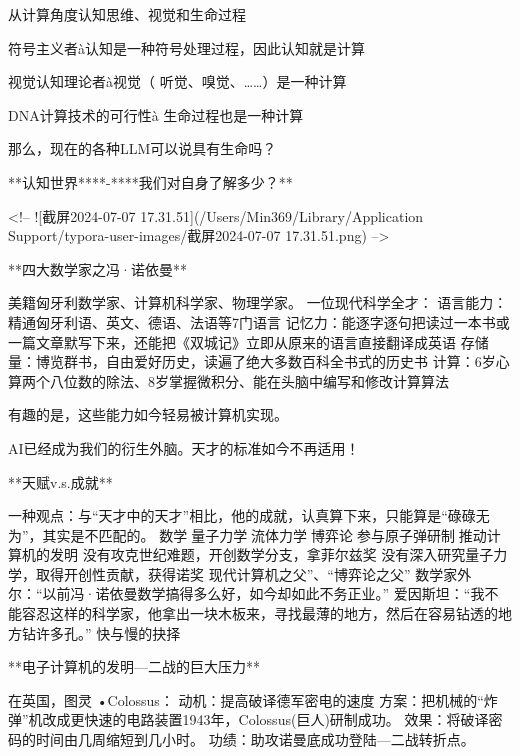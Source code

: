 从计算角度认知思维、视觉和生命过程



符号主义者à认知是一种符号处理过程，因此认知就是计算

视觉认知理论者à视觉（ 听觉、嗅觉、……）是一种计算

DNA计算技术的可行性à 生命过程也是一种计算

那么，现在的各种LLM可以说具有生命吗？



**认知世界****-****我们对自身了解多少？**

<!-- ![截屏2024-07-07 17.31.51](/Users/Min369/Library/Application Support/typora-user-images/截屏2024-07-07 17.31.51.png) -->





**四大数学家之冯·诺依曼**

美籍匈牙利数学家、计算机科学家、物理学家。 
一位现代科学全才：
语言能力：精通匈牙利语、英文、德语、法语等7门语言
记忆力：能逐字逐句把读过一本书或一篇文章默写下来，还能把《双城记》立即从原来的语言直接翻译成英语
存储量：博览群书，自由爱好历史，读遍了绝大多数百科全书式的历史书
计算：6岁心算两个八位数的除法、8岁掌握微积分、能在头脑中编写和修改计算算法



有趣的是，这些能力如今轻易被计算机实现。

AI已经成为我们的衍生外脑。天才的标准如今不再适用！



**天赋v.s.成就**



一种观点：与“天才中的天才”相比，他的成就，认真算下来，只能算是“碌碌无为”，其实是不匹配的。
数学量子力学流体力学博弈论参与原子弹研制推动计算机的发明
没有攻克世纪难题，开创数学分支，拿菲尔兹奖
没有深入研究量子力学，取得开创性贡献，获得诺奖
现代计算机之父”、“博弈论之父” 
数学家外尔：“以前冯·诺依曼数学搞得多么好，如今却如此不务正业。”
爱因斯坦：“我不能容忍这样的科学家，他拿出一块木板来，寻找最薄的地方，然后在容易钻透的地方钻许多孔。”
快与慢的抉择



**电子计算机的发明—二战的巨大压力**



在英国，图灵 •Colossus：
动机：提高破译德军密电的速度
方案：把机械的“炸弹”机改成更快速的电路装置1943年，Colossus(巨人)研制成功。
效果：将破译密码的时间由几周缩短到几小时。
功绩：助攻诺曼底成功登陆---二战转折点。



